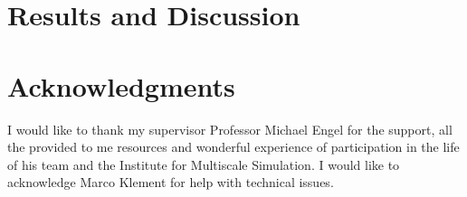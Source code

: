 \documentclass[a4paper]{article}
\begin{document}



\section{Results and Discussion}






\section*{Acknowledgments}
I would like to thank my supervisor Professor Michael Engel for the support, all the provided to me resources and wonderful experience of participation in the life of his team and the Institute for Multiscale Simulation. I would like to acknowledge Marco Klement for help with technical issues. %






%
\end{document}
